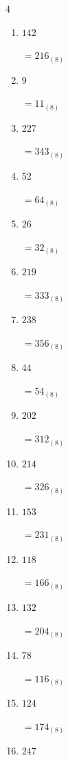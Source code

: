 \begin{multicols}{4}
\begin{enumerate}
        $=133_{(8)}$

  \item $142$

        $=216_{(8)}$

  \item $9$

        $=11_{(8)}$

  \item $227$

        $=343_{(8)}$

  \item $52$

        $=64_{(8)}$

  \item $26$

        $=32_{(8)}$

  \item $219$

        $=333_{(8)}$

  \item $238$

        $=356_{(8)}$

  \item $44$

        $=54_{(8)}$

\columnbreak %

\resetques

  \item $202$

        $=312_{(8)}$

  \item $214$

        $=326_{(8)}$

  \item $153$

        $=231_{(8)}$

  \item $118$

        $=166_{(8)}$

  \item $132$

        $=204_{(8)}$

  \item $78$

        $=116_{(8)}$

  \item $124$

        $=174_{(8)}$

  \item $247$


\end{enumerate}
\end{multicols}
